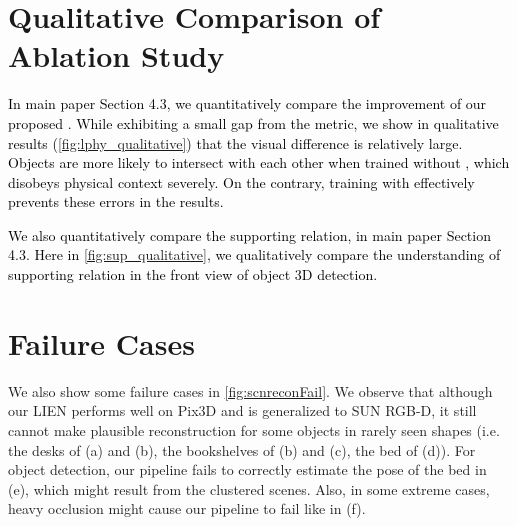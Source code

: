 \documentclass[final]{cvpr}
\newcommand{\zc}[1]{\textcolor{black}{{#1}}}
\let\orgautoref\autoref
\renewcommand{\autoref}[1]{\def\figureautorefname{Fig.}\orgautoref{#1}}
\begin{document}
\section{Qualitative Comparison of Ablation Study}

\zc{
In main paper Section 4.3, we quantitatively compare the improvement of our proposed .
While exhibiting a small gap from the metric, we show in qualitative results (\autoref{fig:lphy_qualitative}) that the visual difference is relatively large.
Objects are more likely to intersect with each other when trained without , which disobeys physical context severely.
On the contrary, training with  effectively prevents these errors in the results.
}

\zc{
We also quantitatively compare the supporting relation, in main paper Section 4.3.
Here in \autoref{fig:sup_qualitative}, we qualitatively compare the understanding of supporting relation in the front view of object 3D detection.
}


\section{Failure Cases}
We also show some failure cases in \autoref{fig:scnreconFail}. We observe that although our LIEN performs well on Pix3D and is generalized to SUN RGB-D, it still cannot make plausible reconstruction for some objects in rarely seen shapes (i.e. the desks of (a) and (b), the bookshelves of (b) and (c), the bed of (d)). For object detection, our pipeline fails to correctly estimate the pose of the bed in (e), which might result from the clustered scenes. Also, in some extreme cases, heavy occlusion might cause our pipeline to fail like in (f).
\end{document}
